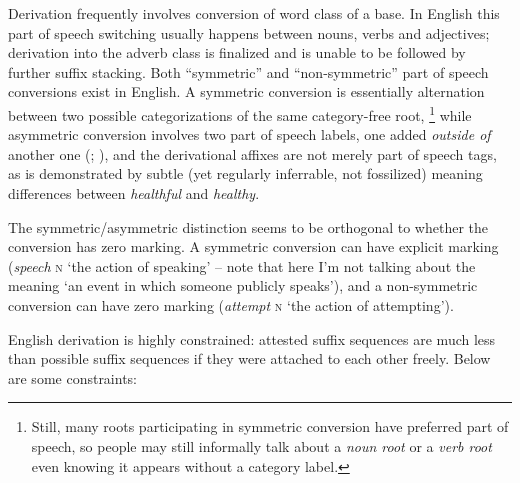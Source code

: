 \documentclass[UTF8, a4paper, oneside, scheme=plain, 12pt]{ctexbook}
\newcommand*{\citepage}[1]{p.~{#1}}
\newcommand*{\term}[1]{\emph{#1}}
\newcommand{\form}[1]{\emph{#1}}
\newcommand{\formcat}[1]{\textsc{#1}}
\newcommand{\translate}[1]{`#1'}
\begin{document}
Derivation frequently involves conversion of word class of a base.
In English this part of speech switching usually happens between 
nouns, verbs and adjectives;
derivation into the adverb class is finalized 
and is unable to be followed by further suffix stacking.
Both ``symmetric'' and ``non-symmetric'' part of speech conversions exist in English.
A symmetric conversion is essentially 
alternation between two possible categorizations of the same category-free root,%
\footnote{
    Still, many roots participating in symmetric conversion 
    have preferred part of speech,
    so people may still informally talk about a \term{noun root} or a \term{verb root}
    even knowing it appears without a category label.
}
while asymmetric conversion involves two part of speech labels,
one added \emph{outside of} another one 
(\citealt[\citepage{1641}]{cgel}; \citealt[\citepage{62}, (15)]{siddiqi2009syntax}),
and the derivational affixes are not merely part of speech tags,
as is demonstrated by 
subtle (yet regularly inferrable, not fossilized) meaning differences between 
\form{healthful} and \form{healthy}.

The symmetric/asymmetric distinction seems to be orthogonal to 
whether the conversion has zero marking.
A symmetric conversion can have explicit marking
(\form{speech} \formcat{n} \translate{the action of speaking} -- 
note that here I'm not talking about the meaning \translate{an event in which someone publicly speaks}), 
and a non-symmetric conversion can have zero marking
(\form{attempt} \formcat{n} \translate{the action of attempting}).


English derivation is highly constrained:
attested suffix sequences are much less than 
possible suffix sequences 
if they were attached to each other freely.
Below are some constraints:
\end{document}
